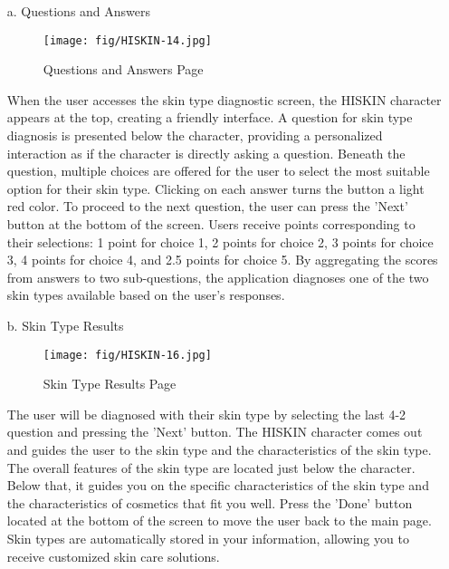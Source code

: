 \documentclass[conference]{IEEEtran}
\begin{document}
\begin{itemize}
    \item[a.]Questions and Answers
    \begin{figure}[h]
    \centering
    \texttt{[image: fig/HISKIN-14.jpg]}
    \label{fig:Questions and Answers}
    \caption{Questions and Answers Page} 
    \end{figure}
    \item[]When the user accesses the skin type diagnostic screen, the HISKIN character appears at the top, creating a friendly interface. A question for skin type diagnosis is presented below the character, providing a personalized interaction as if the character is directly asking a question. Beneath the question, multiple choices are offered for the user to select the most suitable option for their skin type. Clicking on each answer turns the button a light red color. To proceed to the next question, the user can press the 'Next' button at the bottom of the screen. Users receive points corresponding to their selections: 1 point for choice 1, 2 points for choice 2, 3 points for choice 3, 4 points for choice 4, and 2.5 points for choice 5. By aggregating the scores from answers to two sub-questions, the application diagnoses one of the two skin types available based on the user's responses. \\ 
    \clearpage
    \item[b.]Skin Type Results
    \begin{figure}[h]
    \centering
    \texttt{[image: fig/HISKIN-16.jpg]}
    \label{fig:Skin Type Results Page}
    \caption{Skin Type Results Page} 
    \end{figure}
    \item[]The user will be diagnosed with their skin type by selecting the last 4-2 question and pressing the 'Next' button. The HISKIN character comes out and guides the user to the skin type and the characteristics of the skin type. The overall features of the skin type are located just below the character. Below that, it guides you on the specific characteristics of the skin type and the characteristics of cosmetics that fit you well. Press the 'Done' button located at the bottom of the screen to move the user back to the main page. Skin types are automatically stored in your information, allowing you to receive customized skin care solutions. \\ 
\end{itemize}
\end{document}
